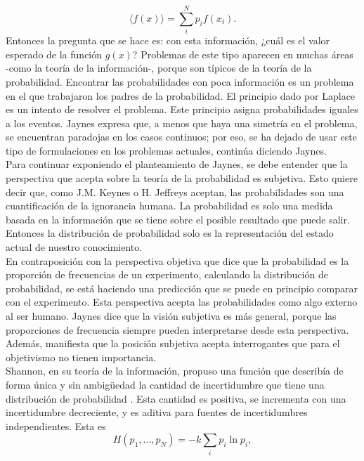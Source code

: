 \begin{equation}
\langle f(x) \rangle =\sum_{i}^{N} p_{i} f(x_{i}).
\end{equation}
Entonces la pregunta que se hace es: con esta información, ¿cuál es el valor esperado de la función $g(x)$? Problemas de este tipo aparecen en muchas áreas -como la teoría de la información-, porque son típicos de la teoría de la probabilidad. Encontrar las probabilidades con poca información es un problema en el que trabajaron los padres de la probabilidad. El principio dado por Laplace es un intento de resolver el problema. Este principio asigna probabilidades iguales a los eventos. Jaynes expresa que, a menos que haya una simetría en el problema, se encuentran paradojas en los casos continuos; por eso, se ha dejado de usar este tipo de formulaciones en los problemas actuales, continúa diciendo Jaynes.
\\
Para continuar exponiendo el planteamiento de Jaynes, se debe entender que la perspectiva que acepta sobre la teoría de la probabilidad es subjetiva. Esto quiere decir que, como J.M. Keynes o H. Jeffreys aceptan, las probabilidades son una cuantificación de la ignorancia humana. La probabilidad es solo una medida basada en la información que se tiene sobre el posible resultado que puede salir. Entonces la distribución de probabilidad solo es la representación del estado actual de nuestro conocimiento. \\
En contraposición con la perspectiva objetiva que dice que la probabilidad es la proporción de frecuencias de un experimento, calculando la distribución de probabilidad, se está haciendo una predicción que se puede en principio comparar con el experimento. Esta perspectiva acepta las probabilidades como algo externo al ser humano. Jaynes dice que la visión subjetiva es más general, porque las proporciones de frecuencia siempre pueden interpretarse desde esta perspectiva. Además, manifiesta que la posición subjetiva acepta interrogantes que para el objetivismo no tienen importancia.
\\
Shannon, en su teoría de la información, propuso una función que describía de forma única y sin ambigüedad la cantidad de incertidumbre que tiene una distribución de probabilidad \cite{ShannonInformation}. Esta cantidad es positiva, se incrementa con una incertidumbre decreciente, y es aditiva para fuentes de incertidumbres independientes. Esta es
\begin{equation}
H(p_{1},...,p_{N})=-k \sum_{i} p_{i} \ln p_{i},
\end{equation}
